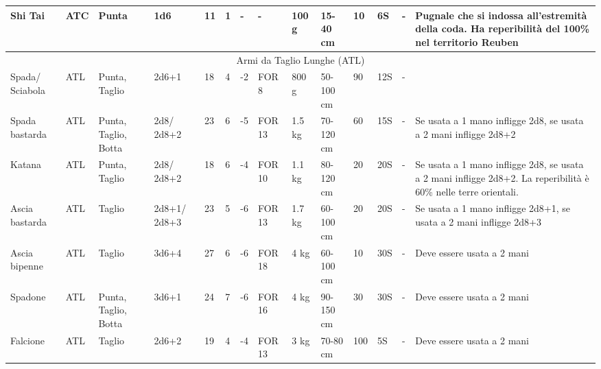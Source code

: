 {\begin{longtable}{|p{1.5cm}|p{0.7cm}|p{0.9cm}|p{0.9cm}|l|l|l|p{0.9cm}|p{0.8cm}|p{1.0cm}|l|l|p{0.75cm}|p{3.2cm}|}
  \raggedright Shi Tai& \raggedright ATC& \raggedright Punta& \raggedright 1d6& \raggedright 11& \raggedright 1& \raggedright -& \raggedright -& \raggedright 100 g& \raggedright 15-40 cm& \raggedright 10& \raggedright 6S& \raggedright -& \raggedright Pugnale che si indossa all'estremit\`a della coda. Ha reperibilit\`a del 100\% nel territorio Reuben\tabularnewline \hline
  \hline \multicolumn{14}{|c|}{\normalsize\sc Armi da Taglio Lunghe (ATL)}\tabularnewline \hline\hline
  \raggedright Spada/ Sciabola& \raggedright ATL& \raggedright Punta, Taglio& \raggedright 2d6+1& \raggedright 18& \raggedright 4& \raggedright -2& \raggedright FOR 8& \raggedright 800 g& \raggedright 50-100 cm& \raggedright 90& \raggedright 12S& \raggedright -& \raggedright \tabularnewline \hline
  \raggedright Spada bastarda& \raggedright ATL& \raggedright Punta, Taglio, Botta& \raggedright 2d8/ 2d8+2& \raggedright 23& \raggedright 6& \raggedright -5& \raggedright FOR 13& \raggedright 1.5 kg& \raggedright 70-120 cm& \raggedright 60& \raggedright 15S& \raggedright -& \raggedright Se usata a 1 mano infligge 2d8, se usata a 2 mani infligge 2d8+2\tabularnewline \hline
  \raggedright Katana& \raggedright ATL& \raggedright Punta, Taglio& \raggedright 2d8/ 2d8+2& \raggedright 18& \raggedright 6& \raggedright -4& \raggedright FOR 10& \raggedright 1.1 kg& \raggedright 80-120 cm& \raggedright 20& \raggedright 20S& \raggedright -& \raggedright Se usata a 1 mano infligge 2d8, se usata a 2 mani infligge 2d8+2. La reperibilit\`a \`e 60\% nelle terre orientali.\tabularnewline \hline
  \raggedright Ascia bastarda& \raggedright ATL& \raggedright Taglio& \raggedright 2d8+1/ 2d8+3& \raggedright 23& \raggedright 5& \raggedright -6& \raggedright FOR 13& \raggedright 1.7 kg& \raggedright 60-100 cm& \raggedright 20& \raggedright 20S& \raggedright -& \raggedright Se usata a 1 mano infligge 2d8+1, se usata a 2 mani infligge 2d8+3\tabularnewline \hline
  \raggedright Ascia bipenne& \raggedright ATL& \raggedright Taglio& \raggedright 3d6+4& \raggedright 27& \raggedright 6& \raggedright -6& \raggedright FOR 18& \raggedright 4 kg& \raggedright 60-100 cm& \raggedright 10& \raggedright 30S& \raggedright -& \raggedright Deve essere usata a 2 mani\tabularnewline \hline
  \raggedright Spadone& \raggedright ATL& \raggedright Punta, Taglio, Botta& \raggedright 3d6+1& \raggedright 24& \raggedright 7& \raggedright -6& \raggedright FOR 16& \raggedright 4 kg& \raggedright 90-150 cm& \raggedright 30& \raggedright 30S& \raggedright -& \raggedright Deve essere usata a 2 mani\tabularnewline \hline
  \raggedright Falcione& \raggedright ATL& \raggedright Taglio& \raggedright 2d6+2& \raggedright 19& \raggedright 4& \raggedright -4& \raggedright FOR 13& \raggedright 3 kg& \raggedright 70-80 cm& \raggedright 100& \raggedright 5S& \raggedright -& \raggedright Deve essere usata a 2 mani\tabularnewline \hline

\end{longtable}}
